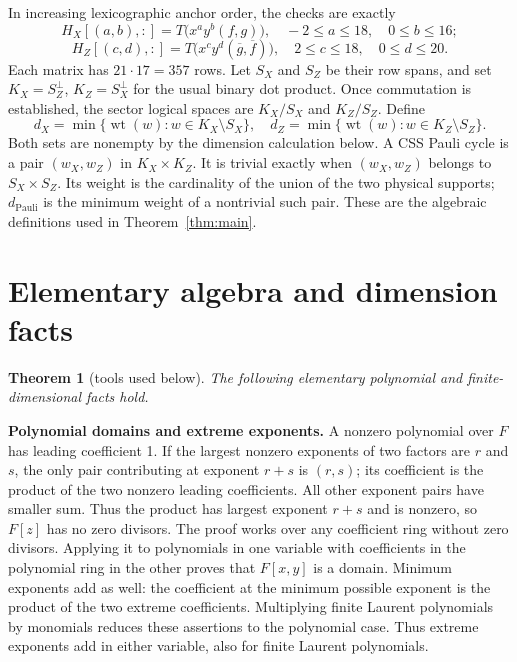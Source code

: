 \documentclass{article}
\newtheorem{theorem}{Theorem}
\DeclareMathOperator{\wt}{wt}
\begin{document}
In increasing lexicographic anchor order, the checks are exactly
\begin{equation}
  H_X[(a,b), {:}] = T\bigl(x^a y^b (f, g)\bigr),
  \quad -2 \le a \le 18, \quad 0 \le b \le 16;
\end{equation}
\begin{equation}
  H_Z[(c,d), {:}] = T\bigl(x^c y^d (\overline{g}, \overline{f})\bigr),
  \quad 2 \le c \le 18, \quad 0 \le d \le 20.
\end{equation}
Each matrix has \(21 \cdot 17 = 357\) rows. Let \(S_X\) and \(S_Z\) be their row spans, and
set \(K_X = S_Z^{\perp}\), \(K_Z = S_X^{\perp}\) for the usual binary dot product. Once
commutation is established, the sector logical spaces are \(K_X/S_X\) and \(K_Z/S_Z\).
Define
\begin{equation}
  d_X = \min\{\wt(w) : w \in K_X \setminus S_X\}, \quad
  d_Z = \min\{\wt(w) : w \in K_Z \setminus S_Z\}.
\end{equation}
Both sets are nonempty by the dimension calculation below. A CSS Pauli cycle is a pair
\((w_X, w_Z)\) in \(K_X \times K_Z\). It is trivial exactly when \((w_X, w_Z)\) belongs to
\(S_X \times S_Z\). Its weight is the cardinality of the union of the two physical supports;
\(d_{\text{Pauli}}\) is the minimum weight of a nontrivial such pair. These are the algebraic
definitions used in Theorem~\ref{thm:main}.

\section{Elementary algebra and dimension facts}\label{sec:tools}

\begin{theorem}[tools used below]\label{thm:tools}
  The following elementary polynomial and finite-dimensional facts hold.
\end{theorem}

\textbf{Polynomial domains and extreme exponents.} A nonzero polynomial over \(F\) has
leading coefficient 1. If the largest nonzero exponents of two factors are \(r\) and \(s\),
the only pair contributing at exponent \(r + s\) is \((r, s)\); its coefficient is the
product of the two nonzero leading coefficients. All other exponent pairs have smaller sum.
Thus the product has largest exponent \(r + s\) and is nonzero, so \(F[z]\) has no zero
divisors. The proof works over any coefficient ring without zero divisors. Applying it to
polynomials in one variable with coefficients in the polynomial ring in the other proves that
\(F[x,y]\) is a domain. Minimum exponents add as well: the coefficient at the minimum
possible exponent is the product of the two extreme coefficients. Multiplying finite Laurent
polynomials by monomials reduces these assertions to the polynomial case. Thus extreme
exponents add in either variable, also for finite Laurent polynomials.
\end{document}
